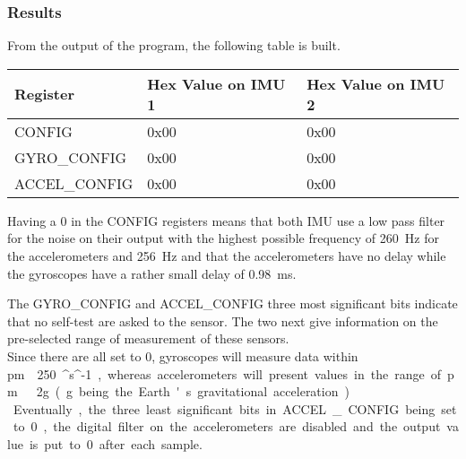 \subsubsection{Results}
From the output of the program, the following table is built.

\begin{table}[H]
	\centering
\begin{tabular}{|l|l|l|}
\hline%
  \textbf{Register}       &  \textbf{Hex Value on IMU 1}  & \textbf{Hex Value on IMU 2} \\
\hline%
  CONFIG                  &   0x00                                & 0x00 \\
\hline%
  GYRO\_CONFIG            &   0x00                                & 0x00 \\
\hline%
  ACCEL\_CONFIG           &   0x00                                & 0x00 \\
\hline%
\end{tabular}
\end{table}

Having a 0 in the CONFIG registers means that both IMU use a low pass filter for the noise on their output with the highest possible frequency of \SI{260}{Hz} for the accelerometers and \SI{256}{Hz} and that the accelerometers have no delay while the gyroscopes have a rather small delay of \SI{0,98}{ms}.

The GYRO\_CONFIG and ACCEL\_CONFIG three most significant bits indicate that no self-test are asked to the sensor. The two next give information on the pre-selected range of measurement of these sensors.\\
Since there are all set to 0, gyroscopes will measure data within \si{\pm\ }\SI{250}{^\circ \cdot s^{-1}}, whereas accelerometers will present values in the range of \si{\pm\ 2g} (g being the Earth's gravitational acceleration).\\
Eventually, the three least significant bits in ACCEL\_CONFIG being set to 0, the digital filter on the accelerometers are disabled and the output value is put to 0 after each sample.